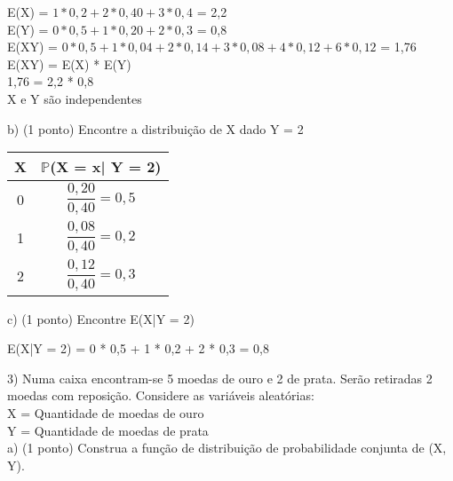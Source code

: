 \documentclass[12pt,a4paper]{article}
\begin{document}
	\begin{center}
		E(X) = $1 * 0,2 + 2 * 0,40 + 3 * 0,4$ = 2,2
		\vspace{0.5cm}\\
		E(Y) = $0 * 0,5 + 1 * 0,20 + 2 * 0,3$ = 0,8
		\vspace{0.5cm}\\
		E(XY) = $0 * 0,5 + 1 * 0,04 + 2 * 0,14 + 3 * 0,08 + 4 * 0,12 + 6 * 0,12$ = 1,76
		\vspace{0.5cm}\\
		E(XY) = E(X) * E(Y)\\
		1,76 = 2,2 * 0,8\\
		\vspace{0.5cm}
		X e Y são independentes
	\end{center}
	\vspace{1cm}
	b) (1 ponto) Encontre a distribuição de X dado Y = 2\\
	\begin{center}
		\begin{tabular}{cc}
			X & $\mathbb{P}$(X = x| Y = 2)\\ \midrule
			0 & $\dfrac{0,20}{0,40} = 0,5$\\ \midrule
			1 & $\dfrac{0,08}{0,40} = 0,2$\\ \midrule
			2 & $\dfrac{0,12}{0,40} = 0,3$\\ \midrule
		\end{tabular}
	\end{center}
	\vspace{1cm}
	c) (1 ponto) Encontre E(X|Y = 2)\\
	\begin{center}
		E(X|Y = 2) = 0 * 0,5 + 1 * 0,2  + 2 * 0,3 = 0,8
	\end{center}
	\vspace{1cm}
	3) Numa caixa encontram-se 5 moedas de ouro e 2 de prata. Serão retiradas 2 moedas com reposição. Considere as variáveis aleatórias:\\
	X = Quantidade de moedas de ouro\\
	Y = Quantidade de moedas de prata\\
	a) (1 ponto) Construa a função de distribuição de probabilidade conjunta de (X, Y).\\
	\begin{center}
	\end{center}
\end{document}

